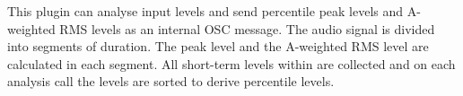 This plugin can analyse input levels and send percentile peak levels and A-weighted RMS levels as an internal OSC message. The audio signal is divided into segments of  duration. The peak level and the A-weighted RMS level are calculated in each segment. All short-term levels within  are collected and on each analysis call the levels are sorted to derive percentile levels.




